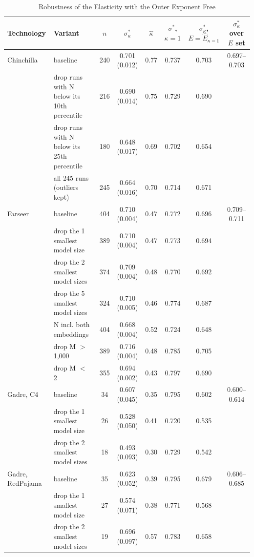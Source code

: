 \begin{table}[tp]
\centering
\caption{Robustness of the Elasticity with the Outer Exponent Free}
\label{tab:kappa-robust}
\footnotesize
\setlength{\tabcolsep}{3pt}
\begin{tabular*}{\textwidth}{@{\extracolsep{\fill}}llcccccc@{}}
\toprule
Technology & Variant & $n$ & $\sigma^*_\kappa$ & $\hat\kappa$ & $\sigma^*$, $\kappa=1$ & $\sigma^*_\kappa$, $E=\hat E_{\kappa=1}$ & $\sigma^*_\kappa$ over $E$ set \\
\midrule
Chinchilla & baseline & 240 & 0.701 (0.012) & 0.77 & 0.737 & 0.703 & 0.697--0.703 \\
 & drop runs with N below its 10th percentile & 216 & 0.690 (0.014) & 0.75 & 0.729 & 0.690 &  \\
 & drop runs with N below its 25th percentile & 180 & 0.648 (0.017) & 0.69 & 0.702 & 0.654 &  \\
 & all 245 runs (outliers kept) & 245 & 0.664 (0.016) & 0.70 & 0.714 & 0.671 &  \\
\addlinespace
Farseer & baseline & 404 & 0.710 (0.004) & 0.47 & 0.772 & 0.696 & 0.709--0.711 \\
 & drop the 1 smallest model size & 389 & 0.710 (0.004) & 0.47 & 0.773 & 0.694 &  \\
 & drop the 2 smallest model sizes & 374 & 0.709 (0.004) & 0.48 & 0.770 & 0.692 &  \\
 & drop the 5 smallest model sizes & 324 & 0.710 (0.005) & 0.46 & 0.774 & 0.687 &  \\
 & N incl. both embeddings & 404 & 0.668 (0.004) & 0.52 & 0.724 & 0.648 &  \\
 & drop M $>$ 1,000 & 389 & 0.716 (0.004) & 0.48 & 0.785 & 0.705 &  \\
 & drop M $<$ 2 & 355 & 0.694 (0.002) & 0.43 & 0.797 & 0.690 &  \\
\addlinespace
Gadre, C4 & baseline & 34 & 0.607 (0.045) & 0.35 & 0.795 & 0.602 & 0.600--0.614 \\
 & drop the 1 smallest model size & 26 & 0.528 (0.050) & 0.41 & 0.720 & 0.535 &  \\
 & drop the 2 smallest model sizes & 18 & 0.493 (0.093) & 0.30 & 0.729 & 0.542 &  \\
\addlinespace
Gadre, RedPajama & baseline & 35 & 0.623 (0.052) & 0.39 & 0.795 & 0.679 & 0.606--0.685 \\
 & drop the 1 smallest model size & 27 & 0.574 (0.071) & 0.38 & 0.771 & 0.568 &  \\
 & drop the 2 smallest model sizes & 19 & 0.696 (0.097) & 0.57 & 0.783 & 0.658 &  \\

\end{tabular*}
\end{table}
